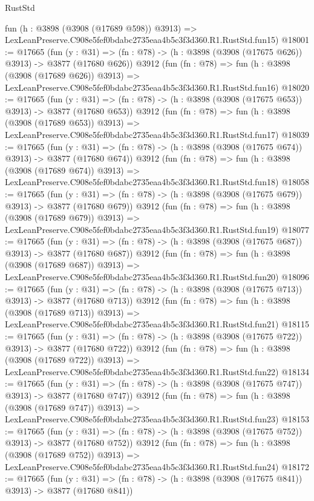 \begin{lexlean}{RustStd}
\begin{coremodule}
    fun (h : @3898 (@3908 (@17689 @598)) @3913) =>
    LexLeanPreserve.C908e5fef0bdabc2735eaa4b5c3f3d360.R1.RustStd.fun15)
@18001 := @17665
    (fun (y : @31) => (fn : @78) -> (h : @3898 (@3908 (@17675 @626)) @3913) -> @3877 (@17680 @626))
    @3912
    (fun (fn : @78) =>
    fun (h : @3898 (@3908 (@17689 @626)) @3913) =>
    LexLeanPreserve.C908e5fef0bdabc2735eaa4b5c3f3d360.R1.RustStd.fun16)
@18020 := @17665
    (fun (y : @31) => (fn : @78) -> (h : @3898 (@3908 (@17675 @653)) @3913) -> @3877 (@17680 @653))
    @3912
    (fun (fn : @78) =>
    fun (h : @3898 (@3908 (@17689 @653)) @3913) =>
    LexLeanPreserve.C908e5fef0bdabc2735eaa4b5c3f3d360.R1.RustStd.fun17)
@18039 := @17665
    (fun (y : @31) => (fn : @78) -> (h : @3898 (@3908 (@17675 @674)) @3913) -> @3877 (@17680 @674))
    @3912
    (fun (fn : @78) =>
    fun (h : @3898 (@3908 (@17689 @674)) @3913) =>
    LexLeanPreserve.C908e5fef0bdabc2735eaa4b5c3f3d360.R1.RustStd.fun18)
@18058 := @17665
    (fun (y : @31) => (fn : @78) -> (h : @3898 (@3908 (@17675 @679)) @3913) -> @3877 (@17680 @679))
    @3912
    (fun (fn : @78) =>
    fun (h : @3898 (@3908 (@17689 @679)) @3913) =>
    LexLeanPreserve.C908e5fef0bdabc2735eaa4b5c3f3d360.R1.RustStd.fun19)
@18077 := @17665
    (fun (y : @31) => (fn : @78) -> (h : @3898 (@3908 (@17675 @687)) @3913) -> @3877 (@17680 @687))
    @3912
    (fun (fn : @78) =>
    fun (h : @3898 (@3908 (@17689 @687)) @3913) =>
    LexLeanPreserve.C908e5fef0bdabc2735eaa4b5c3f3d360.R1.RustStd.fun20)
@18096 := @17665
    (fun (y : @31) => (fn : @78) -> (h : @3898 (@3908 (@17675 @713)) @3913) -> @3877 (@17680 @713))
    @3912
    (fun (fn : @78) =>
    fun (h : @3898 (@3908 (@17689 @713)) @3913) =>
    LexLeanPreserve.C908e5fef0bdabc2735eaa4b5c3f3d360.R1.RustStd.fun21)
@18115 := @17665
    (fun (y : @31) => (fn : @78) -> (h : @3898 (@3908 (@17675 @722)) @3913) -> @3877 (@17680 @722))
    @3912
    (fun (fn : @78) =>
    fun (h : @3898 (@3908 (@17689 @722)) @3913) =>
    LexLeanPreserve.C908e5fef0bdabc2735eaa4b5c3f3d360.R1.RustStd.fun22)
@18134 := @17665
    (fun (y : @31) => (fn : @78) -> (h : @3898 (@3908 (@17675 @747)) @3913) -> @3877 (@17680 @747))
    @3912
    (fun (fn : @78) =>
    fun (h : @3898 (@3908 (@17689 @747)) @3913) =>
    LexLeanPreserve.C908e5fef0bdabc2735eaa4b5c3f3d360.R1.RustStd.fun23)
@18153 := @17665
    (fun (y : @31) => (fn : @78) -> (h : @3898 (@3908 (@17675 @752)) @3913) -> @3877 (@17680 @752))
    @3912
    (fun (fn : @78) =>
    fun (h : @3898 (@3908 (@17689 @752)) @3913) =>
    LexLeanPreserve.C908e5fef0bdabc2735eaa4b5c3f3d360.R1.RustStd.fun24)
@18172 := @17665
    (fun (y : @31) => (fn : @78) -> (h : @3898 (@3908 (@17675 @841)) @3913) -> @3877 (@17680 @841))

\end{coremodule}
\end{lexlean}
